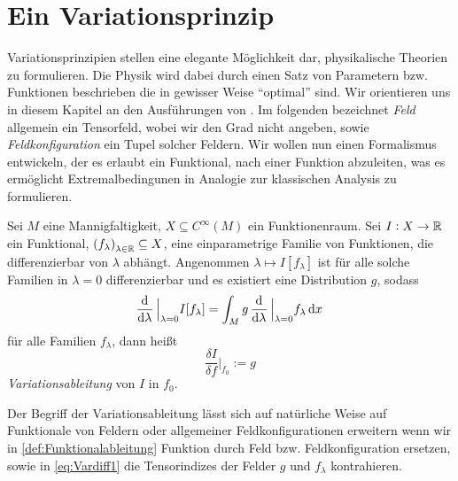 \section{Ein Variationsprinzip}
Variationsprinzipien stellen eine elegante Möglichkeit dar, physikalische
Theorien zu formulieren. Die Physik wird dabei durch einen Satz
von Parametern bzw. Funktionen beschrieben die in gewisser Weise "`optimal"' sind. 
Wir orientieren uns in diesem Kapitel an den Ausführungen von 
\cite[s.454 ff]{wald2010general}.
Im folgenden bezeichnet \emph{Feld} allgemein ein Tensorfeld, wobei wir den
Grad nicht angeben, sowie \emph{Feldkonfiguration} ein Tupel solcher
Feldern. 
Wir wollen nun einen Formalismus entwickeln, der es erlaubt ein Funktional, nach
einer Funktion abzuleiten, was es ermöglicht Extremalbedingunen in Analogie zur
klassischen Analysis zu formulieren.
\begin{definition}[Funktionalableitung] 
\label{def:Funktionalableitung}
Sei $M$ eine Mannigfaltigkeit,
$X\subseteq C^\infty(M)$ ein Funktionenraum. Sei $I:X\to \mathbb{R}$ ein Funktional,
$\left(f_\lambda\right)_{\lambda\in \Reals}\subseteq X$, eine einparametrige
Familie von Funktionen, die differenzierbar von $\lambda$ abhängt.
Angenommen $\lambda\mapsto I\left[f_\lambda\right]$ ist für alle solche Familien
in $\lambda=0$ differenzierbar und es existiert eine Distribution $g$, sodass
 \begin{equation}
 \dod{}{\lambda}\Big|_{\lambda=0}I[f_\lambda]
 =\int_M g\dod{}{\lambda}\Big|_{\lambda=0}f_\lambda\dif x\,
 \label{eq:Vardiff1}
 \end{equation}
 für alle Familien $f_\lambda$, dann heißt
 \begin{equation}
\frac{\delta{I}}{\delta{f}}\bigg|_{f_0}:=g
 \end{equation}
 \emph{Variationsableitung} von $I$ in $f_0$.
\end{definition}
\begin{bemerkung}
Der Begriff der Variationsableitung lässt sich auf natürliche Weise auf 
Funktionale von Feldern oder allgemeiner Feldkonfigurationen erweitern wenn wir
in \autoref{def:Funktionalableitung} Funktion durch Feld bzw. Feldkonfiguration
ersetzen, sowie  in \eqref{eq:Vardiff1} die Tensorindizes der
Felder $g$ und $f_\lambda$ kontrahieren.
\end{bemerkung}
